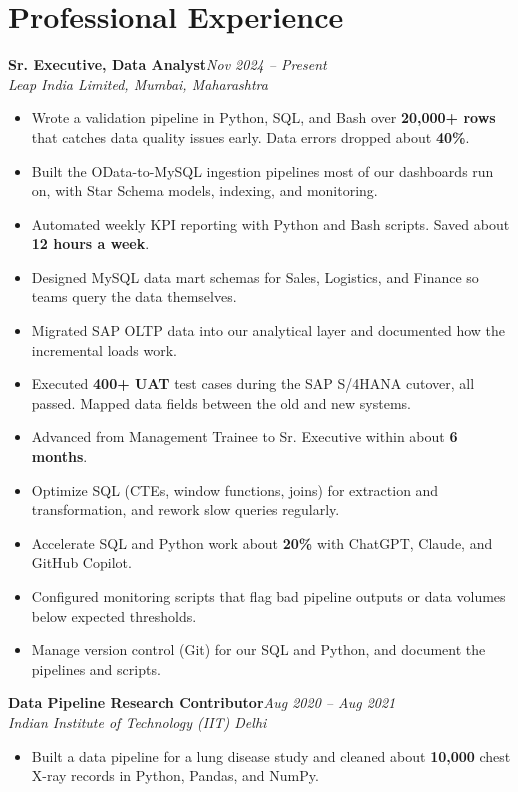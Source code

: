 \documentclass[10pt, letterpaper]{article}
\newcommand{\role}[3]{%
  \vspace{2pt}%
  {\bfseries #1}\hfill{\small\color{muted}\textit{#3}}\\[-2pt]%
  {\small\color{muted}\textit{#2}}%
}
\begin{document}
\section{Professional Experience}

\role{Sr. Executive, Data Analyst}{Leap India Limited, Mumbai, Maharashtra}{Nov 2024 -- Present}

\begin{itemize}
  \item Wrote a validation pipeline in Python, SQL, and Bash over \textbf{20,000+ rows} that catches data quality issues early. Data errors dropped about \textbf{40\%}.
  \item Built the OData-to-MySQL ingestion pipelines most of our dashboards run on, with Star Schema models, indexing, and monitoring.
  \item Automated weekly KPI reporting with Python and Bash scripts. Saved about \textbf{12 hours a week}.
  \item Designed MySQL data mart schemas for Sales, Logistics, and Finance so teams query the data themselves.
  \item Migrated SAP OLTP data into our analytical layer and documented how the incremental loads work.
  \item Executed \textbf{400+ UAT} test cases during the SAP S/4HANA cutover, all passed. Mapped data fields between the old and new systems.
  \item Advanced from Management Trainee to Sr. Executive within about \textbf{6 months}.
  \item Optimize SQL (CTEs, window functions, joins) for extraction and transformation, and rework slow queries regularly.
  \item Accelerate SQL and Python work about \textbf{20\%} with ChatGPT, Claude, and GitHub Copilot.
  \item Configured monitoring scripts that flag bad pipeline outputs or data volumes below expected thresholds.
  \item Manage version control (Git) for our SQL and Python, and document the pipelines and scripts.
\end{itemize}

\vspace{1pt}

\role{Data Pipeline Research Contributor}{Indian Institute of Technology (IIT) Delhi}{Aug 2020 -- Aug 2021}

\begin{itemize}
  \item Built a data pipeline for a lung disease study and cleaned about \textbf{10,000} chest X-ray records in Python, Pandas, and NumPy.
\end{itemize}
\end{document}
